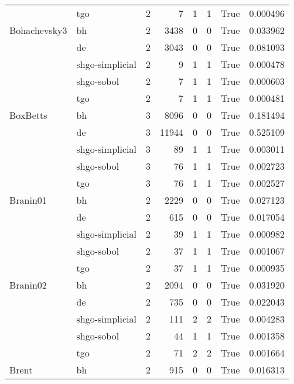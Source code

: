 \begin{longtable}{llrrrrlr}
         & tgo &     2 &        7 &      1 &       1 &    True &    0.000496 \\
Bohachevsky3 & bh &     2 &     3438 &      0 &       0 &    True &    0.033962 \\
         & de &     2 &     3043 &      0 &       0 &    True &    0.081093 \\
         & shgo-simplicial &     2 &        9 &      1 &       1 &    True &    0.000478 \\
         & shgo-sobol &     2 &        7 &      1 &       1 &    True &    0.000603 \\
         & tgo &     2 &        7 &      1 &       1 &    True &    0.000481 \\
BoxBetts & bh &     3 &     8096 &      0 &       0 &    True &    0.181494 \\
         & de &     3 &    11944 &      0 &       0 &    True &    0.525109 \\
         & shgo-simplicial &     3 &       89 &      1 &       1 &    True &    0.003011 \\
         & shgo-sobol &     3 &       76 &      1 &       1 &    True &    0.002723 \\
         & tgo &     3 &       76 &      1 &       1 &    True &    0.002527 \\
Branin01 & bh &     2 &     2229 &      0 &       0 &    True &    0.027123 \\
         & de &     2 &      615 &      0 &       0 &    True &    0.017054 \\
         & shgo-simplicial &     2 &       39 &      1 &       1 &    True &    0.000982 \\
         & shgo-sobol &     2 &       37 &      1 &       1 &    True &    0.001067 \\
         & tgo &     2 &       37 &      1 &       1 &    True &    0.000935 \\
Branin02 & bh &     2 &     2094 &      0 &       0 &    True &    0.031920 \\
         & de &     2 &      735 &      0 &       0 &    True &    0.022043 \\
         & shgo-simplicial &     2 &      111 &      2 &       2 &    True &    0.004283 \\
         & shgo-sobol &     2 &       44 &      1 &       1 &    True &    0.001358 \\
         & tgo &     2 &       71 &      2 &       2 &    True &    0.001664 \\
Brent & bh &     2 &      915 &      0 &       0 &    True &    0.016313 \\

\end{longtable}
